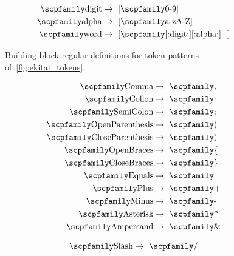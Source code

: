 \documentclass[
  oneside,
  english,
  coorientadorbanca,
  noabntexcite
]{ufsc-thesis-rn46-2019}
\newcommand{\code}[1]{\text{\scpfamily\setlength\spaceskip{0.35em}#1}}
\begin{document}
\begin{figure}[ht]
  \small
  \begin{align*}
    \code{digit} & \rightarrow \ [\code{0-9}]                  \\
    \code{alpha} & \rightarrow \ [\code{a-zA-Z}]               \\
    \code{word}  & \rightarrow \ [\code{[:digit:][:alpha:]\_}]
  \end{align*}
  \caption{
    Building block regular definitions for token patterns of~\cref{fig:ekitai_tokens}.
  }\label{fig:ekitai_tokens_helper}
\end{figure}
\begin{figure}[ht]
  \centering
  \begin{subfigure}[b]{0.3\textwidth}
    \small
    \begin{minipage}{\textwidth}
      \begin{align*}
        \code{Comma}            & \rightarrow \ \code{,}  \\
        \code{Collon}           & \rightarrow \ \code{:}  \\
        \code{SemiColon}        & \rightarrow \ \code{;}  \\
        \code{OpenParenthesis}  & \rightarrow \ \code{(}  \\
        \code{CloseParenthesis} & \rightarrow \ \code{)}  \\
        \code{OpenBraces}       & \rightarrow \ \code{\{} \\
        \code{CloseBraces}      & \rightarrow \ \code{\}} \\
        \code{Equals}           & \rightarrow \ \code{=}  \\
        \code{Plus}             & \rightarrow \ \code{+}  \\
        \code{Minus}            & \rightarrow \ \code{-}  \\
        \code{Asterisk}         & \rightarrow \ \code{*}  \\
        \code{Ampersand}        & \rightarrow \ \code{\&}
      \end{align*}
    \end{minipage}
  \end{subfigure}
  \begin{subfigure}[b]{0.3\textwidth}
    \begin{minipage}{\textwidth}
      \small
      \begin{align*}
        \code{Slash}             & \rightarrow \ \code{/}    \\

\end{align*}
\end{minipage}
\end{subfigure}
\end{figure}
\end{document}
